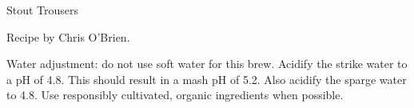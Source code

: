 \begin{recipe}{Stout Trousers}

\begin{aboutblock}
Recipe by Chris O'Brien. 
\end{aboutblock}


\begin{methodandtiming}
 
\begin{mashsteps}
\end{mashsteps}

\begin{fermentationsteps}
\end{fermentationsteps}

\begin{directions}
Water adjustment: do not use soft water for this brew. Acidify the strike water
to a pH of 4.8. This should result in a mash pH of 5.2. Also acidify the sparge
water to 4.8. Use responsibly cultivated, organic ingredients when possible.
\end{directions}

\end{methodandtiming}

\recipebreak

\begin{ingredientsblock}

\begin{malts}
\end{malts}

\begin{hops}
\end{hops}


\end{ingredientsblock}

\end{recipe}

